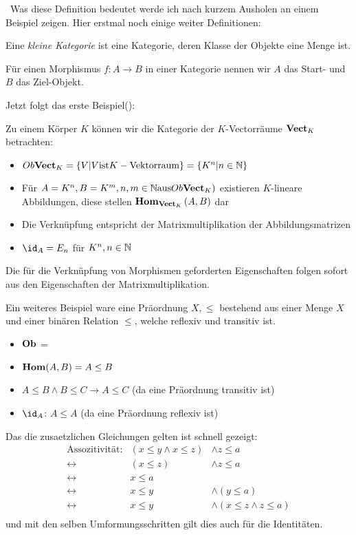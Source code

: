 \documentclass{article}
\begin{document}
		\
		Was  diese Definition bedeutet werde ich nach kurzem Ausholen an einem Beispiel zeigen.
		Hier erstmal noch einige weiter Definitionen:
		
		Eine \emph{kleine Kategorie} ist eine Kategorie, deren Klasse der Objekte eine Menge ist.

		F\"ur einen Morphismus \( f: A \to B \) in einer Kategorie \CatC nennen wir \( A \) das Start- und \( B \) das Ziel-Objekt.
		
		\label{test}
		Jetzt folgt das erste Beispiel(\cite[Beispiel 2.2.10]{Bra}):
		
		Zu einem K\"orper \( K \) k\"onnen wir die Kategorie der \( K\)-Vectorr\"aume \( \mathbf{Vect}_K \) betrachten:
		\begin{itemize}
			\item	\( Ob \mathbf{Vect}_K = \left\lbrace V | V \text{ist} K-\text{Vektorraum} \right\rbrace  = \left\lbrace K^n | n \in \mathbb{N} \right\rbrace \)
			\item F\"ur  \( A=K^n , B =K^m , n,m \in \mathbb{N} \text{aus} Ob\mathbf{Vect}_K) \) existieren $K$-lineare Abbildungen, diese stellen \(  \mathbf{Hom } _{\mathbf{Vect}_K}\left( A,B \right) \) dar
			\item Die Verkn\"upfung entspricht der Matrixmultiplikation der Abbildungsmatrizen 
			\item \( \id_A = E_n \) f\"ur \( K^n , n \in \mathbb{N} \)
		 \end{itemize}
		 Die f\"ur die Verkn\"upfung von Morphismen geforderten Eigenschaften folgen sofort aus den Eigenschaften der Matrixmultiplikation.
		 
		 
		 Ein weiteres Beispiel ware eine Pr\"aordnung \( X, \leq \) bestehend aus einer Menge \( X \) und einer bin\"aren Relation \( \leq \), welche reflexiv und transitiv ist.
		 
		 \begin{itemize}
			 \item \( \mathbf{Ob}  \) = \BN
			 \item \(   \mathbf{Hom } (A,B) = A \leq B \)
			 \item \( A \leq B \wedge B \leq  C \rightarrow A \leq C \)  (da eine Pr\"aordnung transitiv ist) 
			 \item \( \id_A \): \( A \leq A \) (da eine  Pr\"aordnung reflexiv ist)
		 \end{itemize}
			 Das die zusaetzlichen Gleichungen gelten ist schnell gezeigt:
			 \begin{eqnarray}
			  \text{Assozitivit\"at:} &  ( x \leq y \wedge x \leq z ) & \wedge z \leq a \\
					 \leftrightarrow & (x \leq z ) & \wedge  z \leq a \\
					 \leftrightarrow & x \leq a & \\
					 \leftrightarrow & 	x \leq y  & \wedge  (y \leq a) \\
					 \leftrightarrow &   x \leq y & \wedge  (x \leq z  \wedge  z \leq a )\\
			 \end{eqnarray}
			 und mit den selben Umformungsschritten gilt dies auch f\"ur die Identit\"aten.
		 
\end{document}
